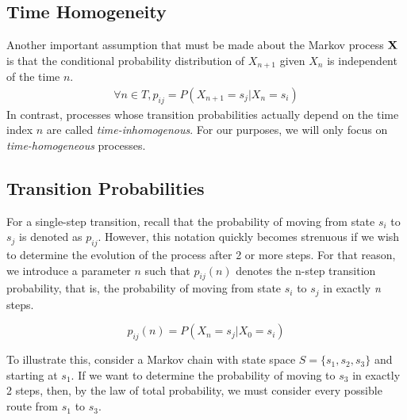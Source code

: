 \documentclass[a4paper,12pt]{article}
\theoremstyle{definition}
\let\oldtextbf\mathbf
\renewcommand{\mathbf}[1]{\oldtextbf{\boldmath #1}}
\begin{document}
\subsection{Time Homogeneity}
	
	Another important assumption that must be made about the Markov process $\mathbf{X}$ is that the conditional probability 
	distribution of $X_{n+1}$ given $X_n$ is independent of the time $n$.
	\begin{equation*}
		\begin{aligned}
			\forall n\in T, p_{ij} = P(X_{n+1} = s_j | X_{n} = s_i)
		\end{aligned}
	\end{equation*}
	In contrast, processes whose transition probabilities actually depend on the time index $n$ are called \emph{time-inhomogenous}.
	For our purposes, we will only focus on \emph{time-homogeneous} processes.
	
\subsection{Transition Probabilities}
	
	For a single-step transition, recall that the probability of moving from state $s_i$ to $s_j$ is denoted as $p_{ij}$. 
	However, this notation quickly becomes strenuous if we wish to determine the evolution of the process after 2 or more
	 steps. For that reason, we introduce a parameter $n$ such that $p_{ij}(n)$ denotes the n-step transition 
	 probability, that is, the probability of moving from state $s_i$ to $s_j$ in exactly \emph{n} steps. 
		
	\[p_{ij}(n) = P(X_{n} = s_j | X_{0} = s_i)\]
	
	To illustrate this, consider a Markov chain with state space $S = \{s_1, s_2, s_3\}$ and starting at $s_1$. If we want 
	to determine the probability of moving to $s_3$ in exactly 2 steps, then, by the law of total probability, we must consider 
	every possible route from $s_1$ to $s_3$.
\end{document}
